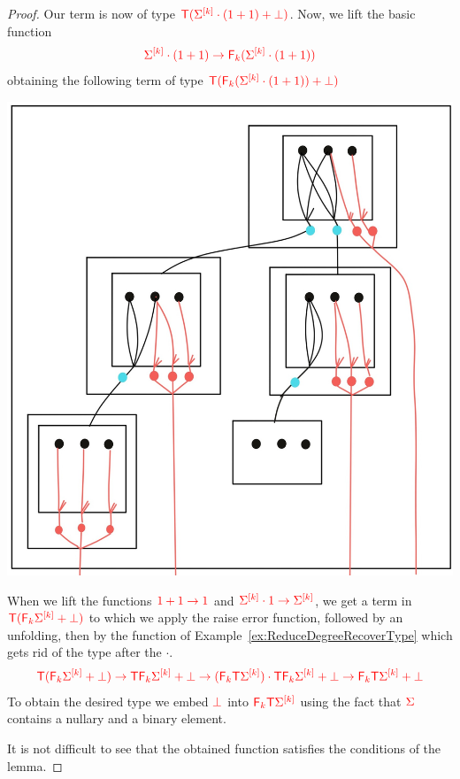 \begin{proof}
Our term is now of type ${\color{red}{{\color{red}{\mathsf T}}(\Sigma^{{\color{red}{[k]}}}\cdot(1+1)+\bot)}}$.
Now, we lift the basic function
\begin{align*}
{\color{red}{\Sigma^{{\color{red}{[k]}}}\cdot(1+1)\to {\color{red}{\mathsf F_{k}}}(\Sigma^{{\color{red}{[k]}}}\cdot(1+1))}}
\end{align*}
obtaining the following term of type ${\color{red}{{\color{red}{\mathsf T}}({\color{red}{\mathsf F_{k}}}(\Sigma^{{\color{red}{[k]}}}\cdot(1+1))+\bot)}}$
\begin{center}
\includegraphics[scale=.1]{MyPic26.jpg}
\end{center}  
When we lift the functions ${\color{red}{1+1\to 1}}$ and ${\color{red}{\Sigma^{{\color{red}{[k]}}}\cdot 1\to \Sigma^{{\color{red}{[k]}}}}}$, we get a term in ${\color{red}{{\color{red}{\mathsf T}}({\color{red}{\mathsf F_{k}}}\Sigma^{{\color{red}{[k]}}}+\bot)}}$ to which we apply the raise error function, followed by an unfolding, then by the function of Example~\ref{ex:ReduceDegreeRecoverType} which gets rid of the type after the $\cdot$.
\begin{align*}
{\color{red}{{\color{red}{\mathsf T}}({\color{red}{\mathsf F_{k}}}\Sigma^{{\color{red}{[k]}}}+\bot)\to {\color{red}{\mathsf T}}{\color{red}{\mathsf F_{k}}}\Sigma^{{\color{red}{[k]}}}+\bot\to ({\color{red}{\mathsf F_{k}}}{\color{red}{\mathsf T}}\Sigma^{{\color{red}{[k]}}})\cdot{\color{red}{\mathsf T}}{\color{red}{\mathsf F_{k}}}\Sigma^{{\color{red}{[k]}}} +\bot\to {\color{red}{\mathsf F_{k}}}{\color{red}{\mathsf T}}\Sigma^{{\color{red}{[k]}}}+\bot }}
\end{align*}
To obtain the desired type  we embed ${\color{red}{\bot}}$ into ${\color{red}{{\color{red}{\mathsf F_{k}}}{\color{red}{\mathsf T}}\Sigma^{{\color{red}{[k]}}}}}$ using the fact that ${\color{red}{\Sigma}}$ contains a nullary and a binary element. 

It is not difficult to see that the obtained function satisfies the conditions of the lemma.
\end{proof}
